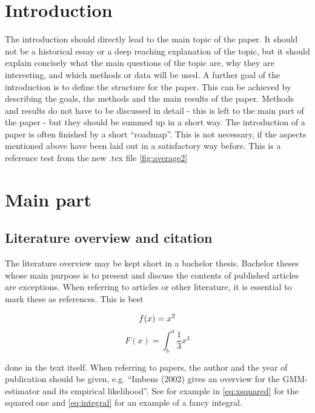 \documentclass[12pt,a4paper]{article}
\begin{document}
\section{Introduction}
The introduction should directly lead to the main topic of the paper. It
should not be a historical essay or a deep reaching explanation of
the topic, but it should explain concisely what the main questions
of the topic are, why they are interesting, and which methods or
data will be used. A further goal of the introduction is to define the
structure for the paper. This can be achieved by describing
the goals, the methods and the main results of the paper.
Methods and results do not have to be
discussed in detail - this is left to the main part of the paper -
 but they should be summed up in a short way.
 The introduction of a paper is often finished by a short ``roadmap''.
 This is not necessary, if the aspects mentioned above have been
 laid out in a satisfactory way before. \citep{hastieElementsStatisticalLearning2017} This is a reference test from the new .tex file \ref{fig:average2}




\section{Main part}
\subsection{Literature overview and citation}
The literature overview may be kept short in a bachelor thesis. Bachelor theses
 whose main purpose is to present and discuss the contents
of published articles are exceptions. When referring to articles or
other literature, it is essential to mark these as references. This is best


\begin{equation}\label{eq:xsquared}
  f(x) = x^2\\
\end{equation}
\begin{equation}\label{eq:integral}
  F(x) = \int^a_b \frac{1}{3}x^3
\end{equation}

done in the text itself. When referring to papers, the author
and the year of publication should be given, e.g. ``Imbens
(2002) gives an overview for the GMM-estimator and its empirical
likelihood''. See for example in \eqref{eq:xsquared} for the squared one
and \eqref{eq:integral} for an example of a fancy integral.
\end{document}
